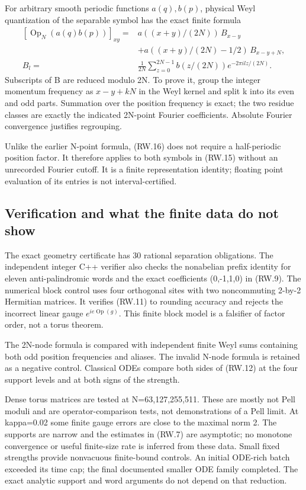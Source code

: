 For arbitrary smooth periodic functions \(a(q),b(p)\), physical Weyl quantization of the separable symbol has the exact finite formula \[
 \begin{split}
 [\operatorname{Op}_N(a(q)b(p))]_{xy}
 ={}&a((x+y)/(2N))\,B_{x-y}\\
 &+a((x+y)/(2N)-1/2)\,B_{x-y+N},\\
 B_l={}&\frac1{2N}\sum_{z=0}^{2N-1}b(z/(2N))e^{-2\pi ilz/(2N)}.
 \end{split}                                               \tag{RW.16}
\] Subscripts of B are reduced modulo 2N. To prove it, group the integer momentum frequency as \(x-y+kN\) in the Weyl kernel and split k into its even and odd parts. Summation over the position frequency is exact; the two residue classes are exactly the indicated 2N-point Fourier coefficients. Absolute Fourier convergence justifies regrouping.

Unlike the earlier N-point formula, (RW.16) does not require a half-periodic position factor. It therefore applies to both symbols in (RW.15) without an unrecorded Fourier cutoff. It is a finite representation identity; floating point evaluation of its entries is not interval-certified.

\subsection{Verification and what the finite data do not show}\label{return_words:verification-and-what-the-finite-data-do-not-show}

The exact geometry certificate has 30 rational separation obligations. The independent integer C++ verifier also checks the nonabelian prefix identity for eleven anti-palindromic words and the exact coefficients (0,-1,1,0) in (RW.9). The numerical block control uses four orthogonal sites with two noncommuting 2-by-2 Hermitian matrices. It verifies (RW.11) to rounding accuracy and rejects the incorrect linear gauge \(e^{ie\operatorname{Op}(g)}\). This finite block model is a falsifier of factor order, not a torus theorem.

The 2N-node formula is compared with independent finite Weyl sums containing both odd position frequencies and aliases. The invalid N-node formula is retained as a negative control. Classical ODEs compare both sides of (RW.12) at the four support levels and at both signs of the strength.

Dense torus matrices are tested at N=63,127,255,511. These are mostly not Pell moduli and are operator-comparison tests, not demonstrations of a Pell limit. At kappa=0.02 some finite gauge errors are close to the maximal norm 2. The supports are narrow and the estimates in (RW.7) are asymptotic; no monotone convergence or useful finite-size rate is inferred from these data. Small fixed strengths provide nonvacuous finite-bound controls. An initial ODE-rich batch exceeded its time cap; the final documented smaller ODE family completed. The exact analytic support and word arguments do not depend on that reduction.

